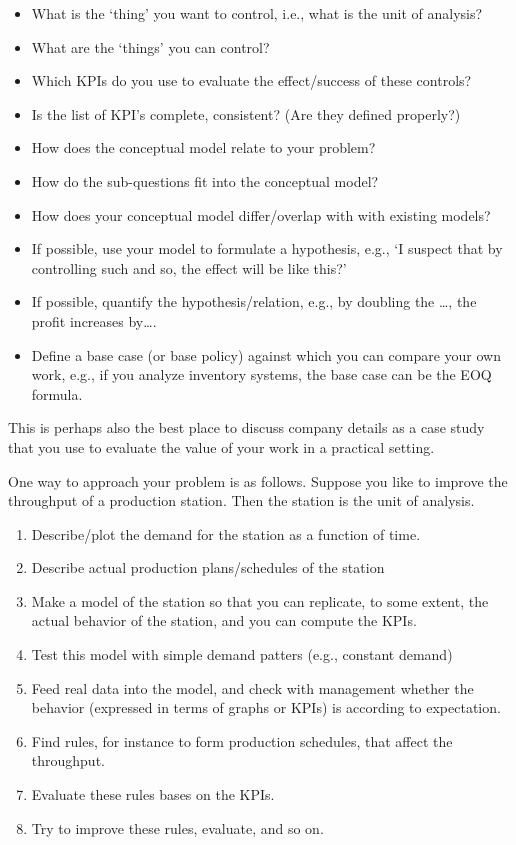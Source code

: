 \documentclass{article}
\begin{document}
\begin{itemize}
\item What is the `thing' you want to control, i.e., what is the unit of analysis?
\item What are the `things' you can control? 
\item Which KPIs do you use to  evaluate the effect/success of these controls?
\item Is the list of KPI's complete, consistent? (Are they defined properly?)
\item How does the conceptual model relate to your problem? 
\item How do the sub-questions fit into the conceptual model?
\item How does your conceptual model differ/overlap with with existing
  models?
\item If possible, use your model to formulate a hypothesis, e.g., `I
  suspect that by controlling such and so, the effect will be like
  this?'
\item If possible, quantify the hypothesis/relation, e.g., by
  doubling the \ldots, the profit increases by\ldots.
\item Define a base case (or base policy) against which you can
  compare your own work, e.g., if you analyze inventory systems, the
  base case can be the EOQ formula.
\end{itemize}

This is perhaps also the best place to discuss company details as a
case study that you use to evaluate the value of your work in a
practical setting.

One way to approach your problem is as follows. Suppose you like to improve the throughput of a production station. Then the station is the unit of analysis.
\begin{enumerate}
\item Describe/plot the demand for the station as a function of time. 
\item Describe actual production plans/schedules of the station
\item Make a model of the station so that you can replicate, to some extent, the actual behavior of the station, and you can compute the KPIs.
\item Test this model with simple demand patters (e.g., constant demand)
\item Feed real data into the model, and check with management whether the behavior (expressed in terms of graphs or KPIs) is according to expectation.
\item Find rules, for instance to form production schedules, that affect the throughput.
\item Evaluate these rules bases on the KPIs. 
\item Try to improve these rules, evaluate, and so on.
\end{enumerate}
\end{document}
